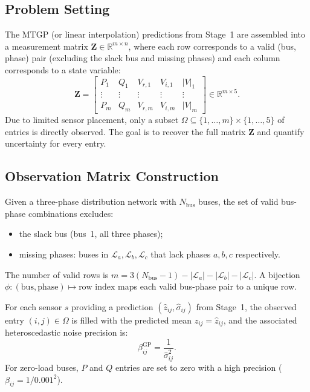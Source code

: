 \documentclass[11pt,a4paper]{article}
\newcommand{\R}{\mathbb{R}}
\begin{document}
\subsection{Problem Setting}
The MTGP (or linear interpolation) predictions from Stage~1 are assembled into a measurement matrix $\bm{Z} \in \R^{m \times n}$, where each row corresponds to a valid (bus, phase) pair (excluding the slack bus and missing phases) and each column corresponds to a state variable:
\begin{equation}
  \bm{Z} = \begin{bmatrix}
  P_1 & Q_1 & V_{r,1} & V_{i,1} & |V|_1 \\
  \vdots & \vdots & \vdots & \vdots & \vdots \\
  P_m & Q_m & V_{r,m} & V_{i,m} & |V|_m
  \end{bmatrix} \in \R^{m \times 5}.
\end{equation}
Due to limited sensor placement, only a subset $\Omega \subseteq \{1,\dots,m\}\times\{1,\dots,5\}$ of entries is directly observed. The goal is to recover the full matrix $\bm{Z}$ and quantify uncertainty for every entry.

\subsection{Observation Matrix Construction}
\label{sec:obs_matrix}
Given a three-phase distribution network with $N_{\text{bus}}$ buses, the set of valid bus-phase combinations excludes:
\begin{itemize}[nosep]
  \item the slack bus (bus~1, all three phases);
  \item missing phases: buses in $\mathcal{L}_a, \mathcal{L}_b, \mathcal{L}_c$ that lack phases $a, b, c$ respectively.
\end{itemize}
The number of valid rows is $m = 3(N_{\text{bus}} - 1) - |\mathcal{L}_a| - |\mathcal{L}_b| - |\mathcal{L}_c|$. A bijection $\phi: (\text{bus}, \text{phase}) \mapsto \text{row index}$ maps each valid bus-phase pair to a unique row.

For each sensor $s$ providing a prediction $(\hat{z}_{ij}, \hat{\sigma}_{ij})$ from Stage~1, the observed entry $(i,j) \in \Omega$ is filled with the predicted mean $z_{ij} = \hat{z}_{ij}$, and the associated heteroscedastic noise precision is:
\begin{equation}\label{eq:beta_gp}
  \beta_{ij}^{\text{GP}} = \frac{1}{\hat{\sigma}_{ij}^{2}}.
\end{equation}
For zero-load buses, $P$ and $Q$ entries are set to zero with a high precision ($\beta_{ij} = 1/0.001^2$).
\end{document}
